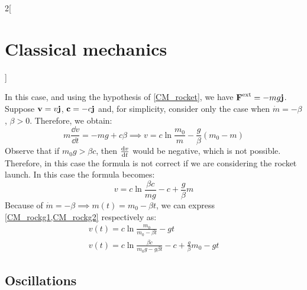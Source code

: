 \documentclass[../../../main.tex]{subfiles}
\begin{document}
\begin{multicols}{2}[\section{Classical mechanics}]
\begin{prop}
  \end{prop}
  \begin{prop}
    In this case, and using the hypothesis of \cref{CM_rocket}, we have $\boldsymbol{\mathrm{F}}^\text{ext}=-mg\boldsymbol{\mathrm{j}}$. Suppose $\boldsymbol{\mathrm{v}}=v\boldsymbol{\mathrm{j}}$, $\boldsymbol{\mathrm{c}}=-c\boldsymbol{\mathrm{j}}$ and, for simplicity, consider only the case when $\dot{m}=-\beta$, $\beta>0$. Therefore, we obtain:
    \begin{equation}
      m\frac{\dd v}{\dd t}=-mg+c\beta\implies v=c\ln\frac{m_0}{m}-\frac{g}{\beta}(m_0-m)
      \label{CM_rockg1}
    \end{equation}
    Observe that if $m_0g>\beta c$, then $\dv{v}{t}$ would be negative, which is not possible. Therefore, in this case the formula is not correct if we are considering the rocket launch. In this case the formula becomes:
    \begin{equation}
      v=c\ln\frac{\beta c}{mg}-c+\frac{g}{\beta}m
      \label{CM_rockg2}
    \end{equation}
    Because of $\dot{m}=-\beta\implies m(t)=m_0-\beta t$, we can express \cref{CM_rockg1,CM_rockg2} respectively as:
    \begin{gather*}
      v(t)=c\ln\frac{m_0}{m_0-\beta t}-gt\\
      v(t)=c\ln\frac{\beta c}{m_0g-g\beta t}-c+\frac{g}{\beta}m_0-gt
    \end{gather*}
  \end{prop}
  \subsection{Oscillations}

\end{multicols}
\end{document}
